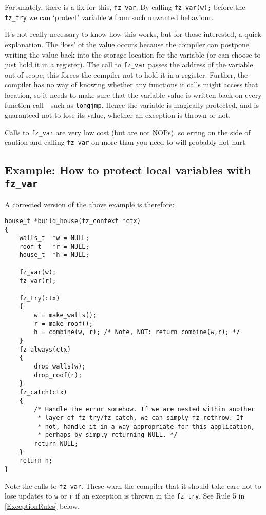 \documentclass[oneside]{book}
\newcommand{\rjwref}[1] {\autoref{#1} \nameref{#1}}
\begin{document}
Fortunately, there is a fix for this, \texttt{fz\_var}. By calling \texttt{fz\_var(w);} before the \texttt{fz\_try} we can `protect' variable \texttt{w} from such unwanted behaviour.

It's not really necessary to know how this works, but for those interested, a quick explanation. The `loss' of the value occurs because the compiler can postpone writing the value back into the storage location for the variable (or can choose to just hold it in a register). The call to \texttt{fz\_var} passes the address of the variable out of scope; this forces the compiler not to hold it in a register. Further, the compiler has no way of knowing whether any functions it calls might access that location, so it needs to make sure that the variable value is written back on every function call - such as \texttt{longjmp}. Hence the variable is magically protected, and is guaranteed not to lose its value, whether an exception is thrown or not.

Calls to \texttt{fz\_var} are very low cost (but are not NOPs), so erring on the side of caution and calling \texttt{fz\_var} on more than you need to will probably not hurt.

\subsection{Example: How to protect local variables with \texttt{fz\_var}}

A corrected version of the above example is therefore:

\begin{lstlisting}
house_t *build_house(fz_context *ctx)
{
    walls_t  *w = NULL;
    roof_t   *r = NULL;
    house_t  *h = NULL;

    fz_var(w);
    fz_var(r);

    fz_try(ctx)
    {
        w = make_walls();
        r = make_roof();
        h = combine(w, r); /* Note, NOT: return combine(w,r); */
    }
    fz_always(ctx)
    {
        drop_walls(w);
        drop_roof(r);
    }
    fz_catch(ctx)
    {
        /* Handle the error somehow. If we are nested within another
         * layer of fz_try/fz_catch, we can simply fz_rethrow. If
         * not, handle it in a way appropriate for this application,
         * perhaps by simply returning NULL. */
        return NULL;
    }
    return h;
}
\end{lstlisting}

Note the calls to \texttt{fz\_var}. These warn the compiler that it should take care not to lose updates to \texttt{w} or \texttt{r} if an exception is thrown in the \texttt{fz\_try}. See Rule 5 in \rjwref{ExceptionRules} below.
\end{document}
